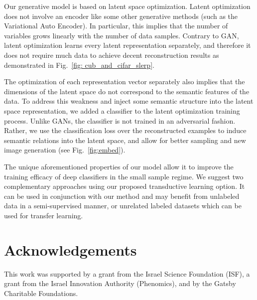 \documentclass[a4paper,conference]{IEEEtran}
\begin{document}
Our generative model is based on latent space optimization. Latent optimization does not involve an encoder like some other generative methods (such as the Variational Auto Encoder). In particular, this implies that the number of variables grows linearly with the number of data samples. Contrary to GAN, latent optimization learns every latent representation separately, and therefore it does not require much data to achieve decent reconstruction results as demonstrated in Fig.~\ref{fig: cub_and_cifar_slerp}. 

The optimization of each representation vector separately also implies that the dimensions of the latent space do not correspond to the semantic features of the data. To address this weakness and inject some semantic structure into the latent space representation, we added a classifier to the latent optimization training process. Unlike GANs, the classifier is not trained in an adversarial fashion. Rather, we use the classification loss  over the reconstructed examples  to induce semantic relations into the latent space, and allow for better sampling and new image generation (see Fig.~\ref{fig:embed}).

The unique aforementioned properties of our model allow it to improve the training efficacy of deep classifiers in the small sample regime. We suggest two complementary approaches using our proposed transductive learning option. It can be used in conjunction with our method and may benefit from unlabeled data in a semi-supervised manner, or unrelated labeled datasets which can be used for transfer learning. 

\section*{Acknowledgements}
This work was supported by a grant from the Israel Science Foundation (ISF), a grant from the Israel Innovation Authority (Phenomics), and by the Gatsby Charitable Foundations.





\vspace{12pt}
\end{document}
